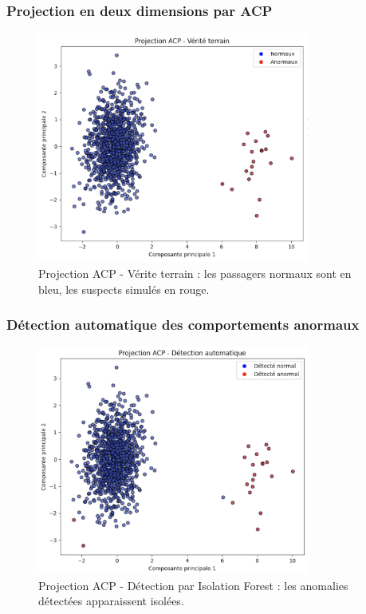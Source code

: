 \documentclass[a4paper,12pt]{report}
\begin{document}
\subsubsection{Projection en deux dimensions par ACP}
\begin{figure}[H]
  \centering
  \includegraphics[width=0.8\textwidth]{projection_verite.png}
  \caption{Projection ACP - V\'erite terrain : les passagers normaux sont en bleu, les suspects simul\'es en rouge.}
  \label{fig:verite}
\end{figure}

\subsubsection{D\'etection automatique des comportements anormaux}
\begin{figure}[H]
  \centering
  \includegraphics[width=0.8\textwidth]{projection_detection.png}
  \caption{Projection ACP - D\'etection par Isolation Forest : les anomalies d\'etect\'ees apparaissent isol\'ees.}
  \label{fig:detection}
\end{figure}
\end{document}
